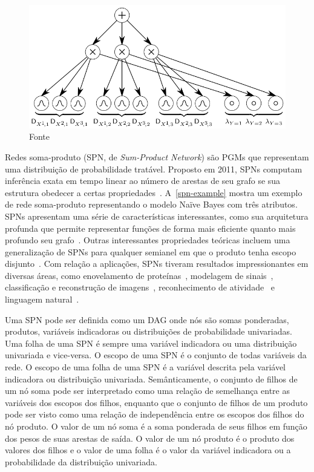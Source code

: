 \documentclass[12pt]{article}
\theoremstyle{plain}
\numberwithin{equation}{section}
\begin{document}
\begin{figure}[h]
  \centering
  \includegraphics[scale=0.4]{nbayes.png}
  \caption{Fonte~\cite{peharz-spn}}\label{spn-example}
\end{figure}

Redes soma-produto (SPN, de \textit{Sum-Product Network}) são PGMs que representam uma distribuição
de probabilidade tratável. Proposto em 2011, SPNs computam inferência exata em tempo linear ao
número de arestas de seu grafo se sua estrutura obedecer a certas
propriedades~\cite{poon-domingos}. A~\autoref{spn-example} mostra um exemplo de rede soma-produto
representando o modelo Naïve Bayes com três atributos. SPNs apresentam uma série de características
interessantes, como sua arquitetura profunda que permite representar funções de forma mais
eficiente quanto mais profundo seu grafo~\cite{shallow-vs-deep}. Outras interessantes propriedades
teóricas incluem uma generalização de SPNs para qualquer semianel em que o produto tenha escopo
disjunto~\cite{sp-theorem}. Com relação a aplicações, SPNs tiveram resultados impressionantes em
diversas áreas, como enovelamento de proteínas~\cite{rec-dec-non-convex}, modelagem de
sinais~\cite{model-speech}, classificação e reconstrução de
imagens~\cite{gens-domingos,poon-domingos,clustering}, reconhecimento de atividade~\cite{activity}
e linguagem natural~\cite{nat-lang}.

Uma SPN pode ser definida como um DAG onde nós são somas ponderadas, produtos, variáveis
indicadoras ou distribuições de probabilidade univariadas. Uma folha de uma SPN é
sempre uma variável indicadora ou uma distribuição univariada e vice-versa. O escopo de uma SPN é o
conjunto de todas variáveis da rede. O escopo de uma folha de uma SPN é a variável descrita pela
variável indicadora ou distribuição univariada. Semânticamente, o conjunto de filhos de um nó soma
pode ser interpretado como uma relação de semelhança entre as variáveis dos escopos dos filhos,
enquanto que o conjunto de filhos de um produto pode ser visto como uma relação de independência
entre os escopos dos filhos do nó produto. O valor de um nó soma é a soma ponderada de seus filhos
em função dos pesos de suas arestas de saída. O valor de um nó produto é o produto dos valores dos
filhos e o valor de uma folha é o valor da variável indicadora ou a probabilidade da distribuição
univariada.
\end{document}
